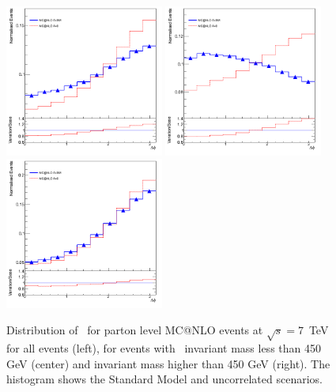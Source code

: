 \begin{figure}[htpb!]
\begin{center}
\includegraphics[width=52mm]{f/truth_delta_Phi10_truth_comparison}
\includegraphics[width=52mm]{f/truth_delta_Phi10_low_truth_comparison}
\includegraphics[width=52mm]{f/truth_delta_Phi10_high_truth_comparison}
\end{center}
\caption{Distribution of \dphi\ for parton level MC@NLO events at $\sqrt{s}=7$~TeV for all events (left), for events with \ttbar\ invariant mass less than 450 GeV (center) and invariant mass higher than 450 GeV (right). The histogram shows the Standard Model and uncorrelated scenarios. }
\label{fig:parton_dphi}
\end{figure} 

